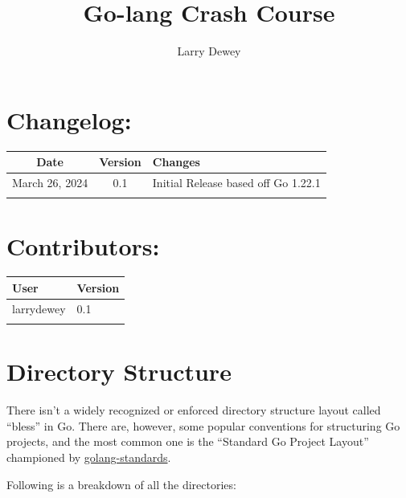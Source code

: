 \documentclass[letterpaper,12pt]{article}
\title{Go-lang Crash Course}
\author{Larry Dewey}
\date{} %
\begin{document}
\maketitle
\newpage

\section*{Changelog:}

\begin{tabular}{|c|c|p{20em}|}
  \hline
  \textbf{Date} & \textbf{Version} & \textbf{Changes} \\
  \hline
  March 26, 2024 & 0.1 & Initial Release based off Go 1.22.1\\
  \hline
  & & \\
  \hline
\end{tabular}
  
\newpage

\section*{Contributors:}
\begin{tabular}{|p{15em}|p{15em}|}
  \hline
  \textbf{User} & \textbf{Version} \\
  \hline
  larrydewey & 0.1 \\
  \hline
  & \\
  \hline
\end{tabular}
\newpage

\tableofcontents

\newpage

\section{Directory Structure}\label{directory-structure}

There isn't a widely recognized or enforced directory structure layout
called ``bless'' in Go. There are, however, some popular conventions for
structuring Go projects, and the most common one is the ``Standard Go
Project Layout'' championed by
\href{https://github.com/golang-standards/project-layout}{golang-standards}.


\noindent
Following is a breakdown of all the directories:
\end{document}
